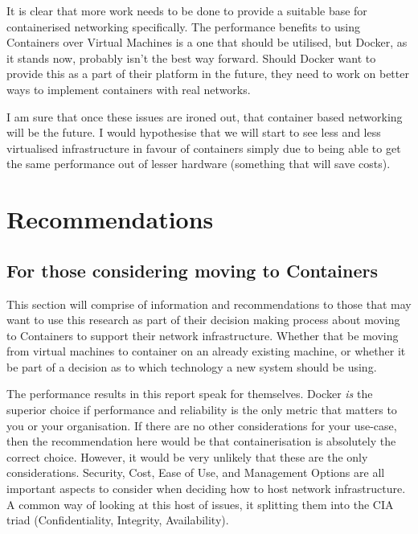 It is clear that more work needs to be done to provide a suitable base for containerised networking specifically. The performance benefits to using Containers over Virtual Machines is a one that should be utilised, but Docker, as it stands now, probably isn't the best way forward. Should Docker want to provide this as a part of their platform in the future, they need to work on better ways to implement containers with real networks.

I am sure that once these issues are ironed out, that container based networking will be the future. I would hypothesise that we will start to see less and less virtualised infrastructure in favour of containers simply due to being able to get the same performance out of lesser hardware (something that will save costs).

\chapter{Recommendations}

\section{For those considering moving to Containers}
\label{sec:RecSMEs}
This section will comprise of information and recommendations to those that may want to use this research as part of their decision making process about moving to Containers to support their network infrastructure. Whether that be moving from virtual machines to container on an already existing machine, or whether it be part of a decision as to which technology a new system should be using.

The performance results in this report speak for themselves. Docker \emph{is} the superior choice if performance and reliability is the only metric that matters to you or your organisation. If there are no other considerations for your use-case, then the recommendation here would be that containerisation is absolutely the correct choice. However, it would be very unlikely that these are the only considerations. Security, Cost, Ease of Use, and Management Options are all important aspects to consider when deciding how to host network infrastructure. A common way of looking at this host of issues, it splitting them into the CIA triad (Confidentiality, Integrity, Availability).
